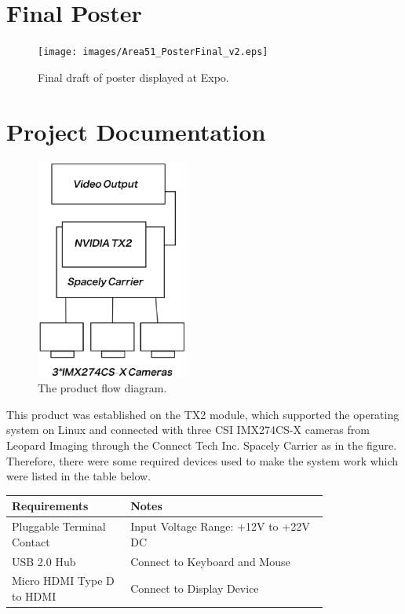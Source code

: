 \documentclass[letterpaper,10pt,serif,draftclsnofoot,onecolumn,compsoc,titlepage]{IEEEtran}
\begin{document}
	\newpage

\section{Final Poster}

	\begin{figure}[H]
		\centering
		\label{fig:ExpoPosterFinal_v2}
		\texttt{[image: images/Area51\_PosterFinal\_v2.eps]}
		\caption{Final draft of poster displayed at Expo. \label{overflow}}
	\end{figure}

\newpage

\section{Project Documentation}
\begin{figure}[H]
  \centering
  \label{fig: The product flow diagram.}
  \includegraphics[width=5cm]{images/diagram2.eps}
  \caption{The product flow diagram. \label{overflow}}
\end{figure}

This product was established on the TX2 module, which supported the operating system on Linux and 
connected with three CSI IMX274CS-X cameras from Leopard Imaging through the Connect Tech Inc. 
Spacely Carrier as in the figure. Therefore, there were some required devices used to make the 
system work which were listed in the table below. \\

\begin{tabular}{|p{0.3\linewidth}|p{0.5\linewidth}|}
   \hline
   \textbf{Requirements} & \textbf{Notes} \\ 
   \hline
	Pluggable Terminal Contact & Input Voltage Range: +12V to +22V DC \\
   \hline
   USB 2.0 Hub & Connect to Keyboard and Mouse \\
   \hline
   Micro HDMI Type D to HDMI & Connect to Display Device \\
   \hline
\end{tabular}
\end{document}
